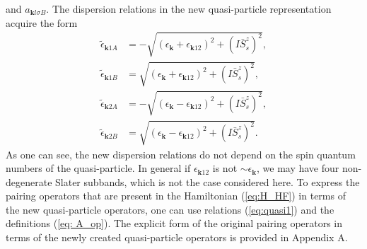 \documentclass[aps,prb,showpacs,reprint]{revtex4-1}
\begin{document}
and $a_{\mathbf{k}l\sigma B}$. 
The dispersion relations in the new quasi-particle representation
acquire the form
\begin{equation}
 \begin{split}
  \tilde{\epsilon}_{\mathbf{k}1 A}&=-\sqrt{(\epsilon_
{\mathbf{k}}+\epsilon_{\mathbf{k}12})^2+(I\bar{S}^z_s)^2},\\
  \tilde{\epsilon}_{\mathbf{k}1 B}&=\sqrt{(\epsilon_
{\mathbf{k}}+\epsilon_{\mathbf{k}12})^2+(I\bar{S}^z_s)^2}, \\
  \tilde{\epsilon}_{\mathbf{k}2 A}&=-\sqrt{(\epsilon_
{\mathbf{k}}-\epsilon_{\mathbf{k}12})^2+(I\bar{S}^z_s)^2},\\
  \tilde{\epsilon}_{\mathbf{k}2 B}&=\sqrt{(\epsilon_
{\mathbf{k}}-\epsilon_{\mathbf{k}12})^2+(I\bar{S}^z_s)^2}.
 \end{split}
\end{equation}
As one can see, the new dispersion relations do not depend on the spin quantum numbers of the
quasi-particle. In general if
$\epsilon_{\mathbf{k}12}$ is not  $\sim \epsilon_{\mathbf{k}}$, we may have four
non-degenerate Slater subbands, which is not the case considered here. 
To express the pairing operators that are present in the Hamiltonian
(\ref{eq:H_HF}) in terms of the new quasi-particle operators, one
can use relations (\ref{eq:quasi1}) and the definitions (\ref{eq: A_op}).
The explicit form of the original pairing operators in terms
of the newly created quasi-particle operators is provided in 
Appendix A.
\end{document}
